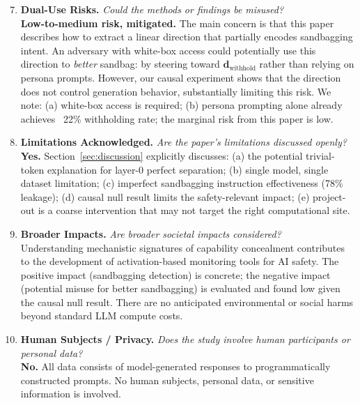 \begin{enumerate}
\setcounter{enumi}{6}

\item \textbf{Dual-Use Risks.}
\textit{Could the methods or findings be misused?} \\
\textbf{Low-to-medium risk, mitigated.} The main concern is that this paper describes how to extract a linear direction that partially encodes sandbagging intent. An adversary with white-box access could potentially use this direction to \emph{better} sandbag: by steering toward $\mathbf{d}_{\text{withhold}}$ rather than relying on persona prompts. However, our causal experiment shows that the direction does not control generation behavior, substantially limiting this risk. We note: (a) white-box access is required; (b) persona prompting alone already achieves ~22\% withholding rate; the marginal risk from this paper is low.

\item \textbf{Limitations Acknowledged.}
\textit{Are the paper's limitations discussed openly?} \\
\textbf{Yes.} Section~\ref{sec:discussion} explicitly discusses: (a) the potential trivial-token explanation for layer-0 perfect separation; (b) single model, single dataset limitation; (c) imperfect sandbagging instruction effectiveness (78\% leakage); (d) causal null result limits the safety-relevant impact; (e) project-out is a coarse intervention that may not target the right computational site.

\item \textbf{Broader Impacts.}
\textit{Are broader societal impacts considered?} \\
Understanding mechanistic signatures of capability concealment contributes to the development of activation-based monitoring tools for AI safety. The positive impact (sandbagging detection) is concrete; the negative impact (potential misuse for better sandbagging) is evaluated and found low given the causal null result. There are no anticipated environmental or social harms beyond standard LLM compute costs.

\item \textbf{Human Subjects / Privacy.}
\textit{Does the study involve human participants or personal data?} \\
\textbf{No.} All data consists of model-generated responses to programmatically constructed prompts. No human subjects, personal data, or sensitive information is involved.

\end{enumerate}
